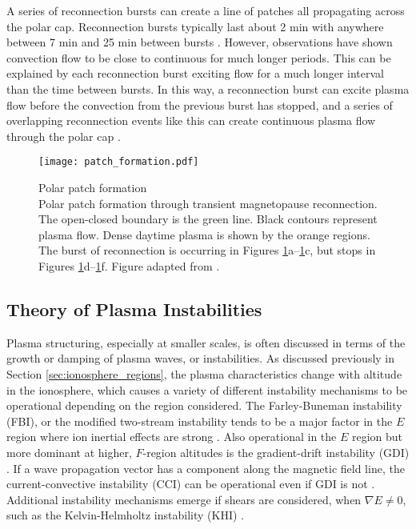 A series of reconnection bursts can create a line of patches all propagating across the polar cap.  Reconnection bursts typically last about 2 min with anywhere between 7 min and 25 min between bursts \citep{Foster1984,Etemadi1988,Lockwood1992b}.  However, observations have shown convection flow to be close to continuous for much longer periods.  This can be explained by each reconnection burst exciting flow for a much longer interval than the time between bursts.  In this way, a reconnection burst can excite plasma flow before the convection from the previous burst has stopped, and a series of overlapping reconnection events like this can create continuous plasma flow through the polar cap \citep{Cowley1991}. 

\begin{figure}
	\centering
	\texttt{[image: patch\_formation.pdf]}
	\caption[Polar patch formation]{{\:}Polar patch formation\\ Polar patch formation through transient magnetopause reconnection.  The open-closed boundary is the green line.  Black contours represent plasma flow.  Dense daytime plasma is shown by the orange regions.  The burst of reconnection is occurring in Figures \ref{fig:patch_formation}a--\ref{fig:patch_formation}c, but stops in Figures \ref{fig:patch_formation}d--\ref{fig:patch_formation}f.  Figure adapted from \citet{Cowley1991}.}
	\label{fig:patch_formation}
\end{figure}

\subsection{Theory of Plasma Instabilities}
\label{sec:lit_instabilities}
Plasma structuring, especially at smaller scales, is often discussed in terms of the growth or damping of plasma waves, or instabilities.  As discussed previously in Section \ref{sec:ionosphere_regions}, the plasma characteristics change with altitude in the ionosphere, which causes a variety of different instability mechanisms to be operational depending on the region considered.  The Farley-Buneman instability (FBI), or the modified two-stream instability tends to be a major factor in the \(E\) region where ion inertial effects are strong \citep{Farley1963,Buneman1963}.  Also operational in the \(E\) region but more dominant at higher, \(F\)-region altitudes is the gradient-drift instability (GDI) \citep{Simon1963,Hoh1963,Linson1970}.  If a wave propagation vector has a component along the magnetic field line, the current-convective instability (CCI) can be operational even if GDI is not \citep{Hoh1960,Ossakow1979,Chaturvedi1981}.  Additional instability mechanisms emerge if shears are considered, when \(\nabla E \neq 0\), such as the Kelvin-Helmholtz instability (KHI) \citep{Kintner1977,DAngelo1965}.

